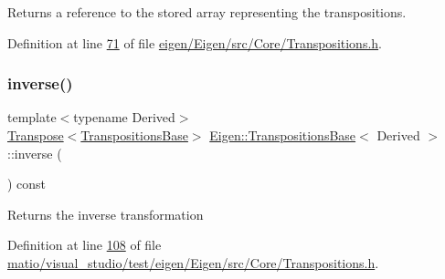 \begin{DoxyReturn}{Returns}
a reference to the stored array representing the transpositions. 
\end{DoxyReturn}


Definition at line \hyperlink{eigen_2_eigen_2src_2_core_2_transpositions_8h_source_l00071}{71} of file \hyperlink{eigen_2_eigen_2src_2_core_2_transpositions_8h_source}{eigen/\+Eigen/src/\+Core/\+Transpositions.\+h}.

\mbox{\label{class_eigen_1_1_transpositions_base_affcac2f2ebcd5a8bf9067e20d3681d78}} 
\subsubsection{\texorpdfstring{inverse()}{inverse()}\hspace{0.1cm}{\footnotesize\ttfamily [1/2]}}
{\footnotesize\ttfamily template$<$typename Derived$>$ \\
\hyperlink{group___core___module_class_eigen_1_1_transpose}{Transpose}$<$\hyperlink{class_eigen_1_1_transpositions_base}{Transpositions\+Base}$>$ \hyperlink{class_eigen_1_1_transpositions_base}{Eigen\+::\+Transpositions\+Base}$<$ Derived $>$\+::inverse (\begin{DoxyParamCaption}{ }\end{DoxyParamCaption}) const\hspace{0.3cm}{\ttfamily [inline]}}

\begin{DoxyReturn}{Returns}
the inverse transformation 
\end{DoxyReturn}


Definition at line \hyperlink{matio_2visual__studio_2test_2eigen_2_eigen_2src_2_core_2_transpositions_8h_source_l00108}{108} of file \hyperlink{matio_2visual__studio_2test_2eigen_2_eigen_2src_2_core_2_transpositions_8h_source}{matio/visual\+\_\+studio/test/eigen/\+Eigen/src/\+Core/\+Transpositions.\+h}.

\mbox{\label{class_eigen_1_1_transpositions_base_affcac2f2ebcd5a8bf9067e20d3681d78}} 
